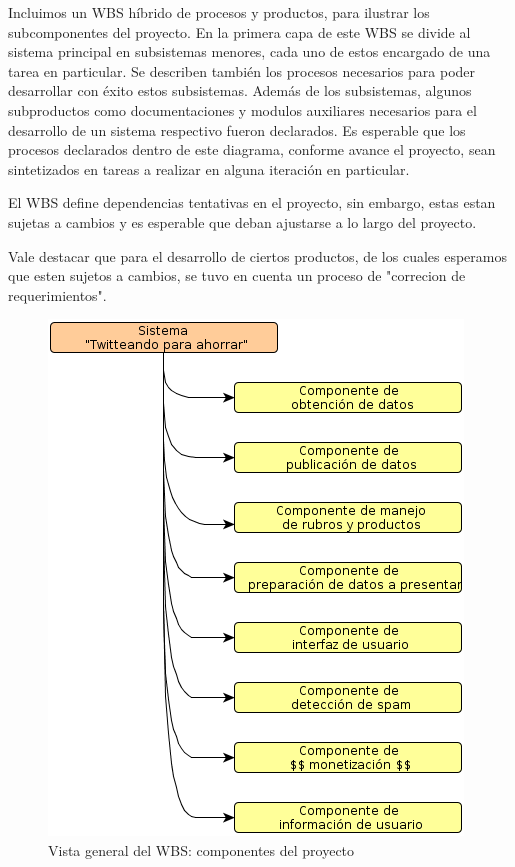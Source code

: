 

\newcommand{\escaladefault}{0.85}

Incluimos un WBS híbrido de procesos y productos, para ilustrar los subcomponentes del proyecto. En la primera capa de este WBS se divide al sistema principal en subsistemas menores, cada uno de estos encargado de una tarea en particular.
Se describen también los procesos necesarios para poder desarrollar con éxito estos subsistemas. Además 
de los subsistemas, algunos subproductos como documentaciones y modulos auxiliares necesarios para el desarrollo 
de un sistema respectivo fueron declarados.
Es esperable que los procesos declarados dentro de este diagrama, conforme avance el proyecto, sean sintetizados en tareas 
a realizar en alguna iteración en particular.

El WBS define dependencias tentativas en el proyecto, sin embargo, estas estan sujetas a cambios y es esperable que deban 
ajustarse a lo largo del proyecto.

Vale destacar que para el desarrollo de ciertos productos, de los cuales esperamos que esten sujetos a cambios, se tuvo en 
cuenta un proceso de "correcion de requerimientos".

\begin{figure}[H]
\centering
\includegraphics[scale=\escaladefault]{graficos/wbs/primera_capa.png}
\caption{Vista general del WBS: componentes del proyecto}
\end{figure}


